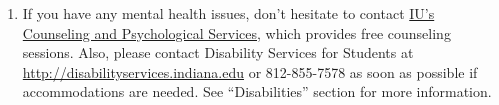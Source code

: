 \documentclass[11pt,article,oneside]{memoir} %
\begin{document}
\begin{enumerate}


\item If you have any mental health issues, don't hesitate to contact \href{http://healthcenter.indiana.edu/counseling/index.shtml}{IU's Counseling and Psychological Services}, which provides free counseling sessions. Also, please contact Disability Services for Students at \url{http://disabilityservices.indiana.edu} or 812-855-7578 as soon as possible if accommodations are needed. See ``Disabilities'' section for more information. 


\end{enumerate}%
\end{document}
